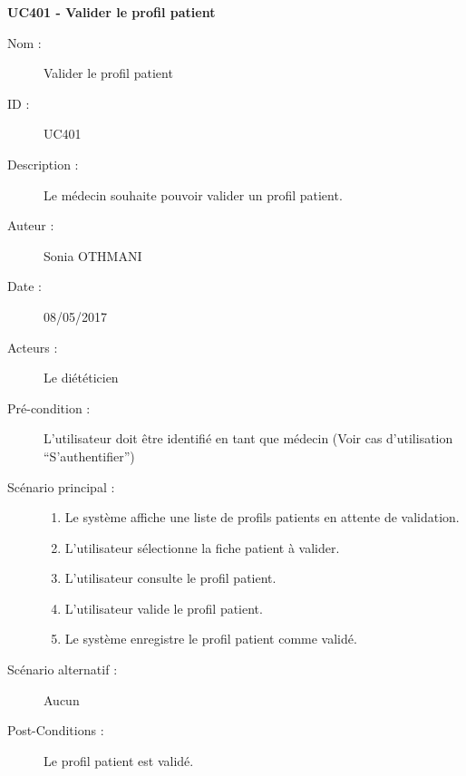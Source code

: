 \textbf{UC401 - Valider le profil patient}
\begin{description}
\item [Nom :] Valider le profil patient
\item [ID :] UC401
\item [Description :] Le médecin souhaite pouvoir valider un profil patient.
\item [Auteur :] Sonia OTHMANI
\item [Date :] 08/05/2017
\item [Acteurs :] Le diététicien
\item [Pré-condition :] L’utilisateur doit être identifié en tant que médecin (Voir cas d’utilisation \enquote{S’authentifier})
\item [Scénario principal :]
  \begin{enumerate}
  \item Le système affiche une liste de profils patients en attente de validation.
  \item L’utilisateur sélectionne la fiche patient à valider.
  \item L’utilisateur consulte le profil patient.
  \item L’utilisateur valide le profil patient.
  \item Le système enregistre le profil patient comme validé.
  \end{enumerate}
\item [Scénario alternatif :] Aucun
\item [Post-Conditions :] Le profil patient est validé.
\end{description}

